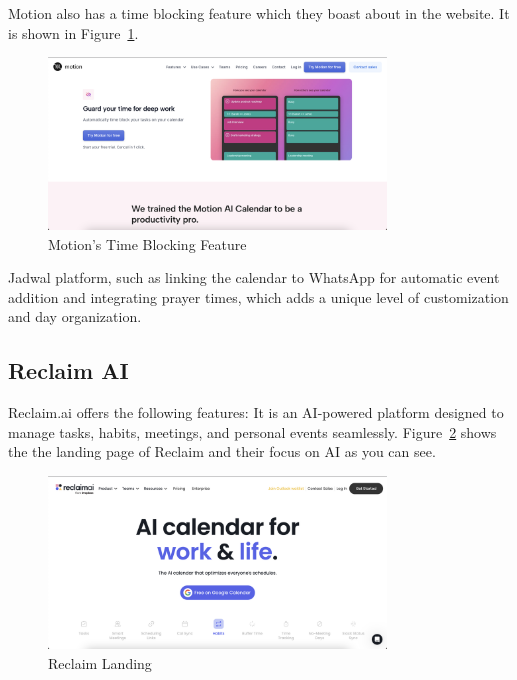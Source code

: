 \documentclass[12pt,a4paper,twoside]{report}
\begin{document}
Motion also has a time blocking feature which they boast about in the website.
It is shown in Figure~\ref{fig:motion-time-blocking}.

\begin{figure}[!h]
    \centering
    \includegraphics[width=0.8\textwidth]{images/competitors/motion-time-blocking.png}
    \caption{Motion's Time Blocking Feature}
    \label{fig:motion-time-blocking}
\end{figure}

Jadwal platform, such as linking the calendar to WhatsApp for automatic event addition and integrating prayer times, which adds a unique level of customization and day organization.

\subsection{Reclaim AI}

Reclaim.ai offers the following features: It is an AI-powered platform designed to manage tasks, habits, meetings, and personal events seamlessly.
Figure~\ref{fig:reclaim-landing} shows the the landing page of Reclaim and their focus on AI as you can see.

\begin{figure}[!h]
    \centering
    \includegraphics[width=0.8\textwidth]{images/competitors/reclaim-landing.png}
    \caption{Reclaim Landing}
    \label{fig:reclaim-landing}
\end{figure}
\end{document}
